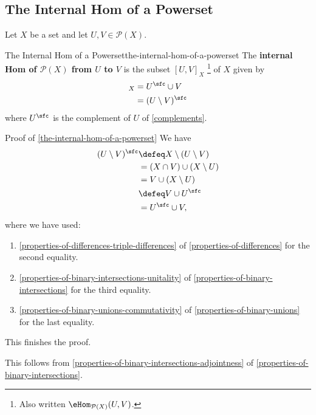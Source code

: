 \subsection{The Internal Hom of a Powerset}\label{subsection-the-internal-hom-of-a-powerset}
Let $X$ be a set and let $U,V\in\mathcal{P}(X)$.
\begin{proposition}{The Internal Hom of a Powerset}{the-internal-hom-of-a-powerset}%
    The \textbf{internal Hom of $\mathcal{P}(X)$ from $U$ to $V$} is the subset $[U,V]_{X}$%
    \footnote{%
        Also written $\eHom_{\mathcal{P}(X)}(U,V)$.
        \par\vspace*{\TCBBoxCorrection}
    } %
    of $X$ given by
    \begin{align*}
        [U,V]_{X} &= U^{\sfc}\cup V\\%
                  &= (U\setminus V)^{\sfc}%
    \end{align*}
    where $U^{\sfc}$ is the complement of $U$ of \cref{complements}.
\end{proposition}
\begin{Proof}{Proof of \cref{the-internal-hom-of-a-powerset}}%
    We have
    \begin{align*}
        (U\setminus V)^{\sfc} &\defeq X\setminus(U\setminus V)\\%
                              &=      (X\cap V)\cup(X\setminus U)\\%
                              &=      V\cup(X\setminus U)\\%
                              &\defeq V\cup U^{\sfc}\\%
                              &=      U^{\sfc}\cup V,%
    \end{align*}
    where we have used:
    \begin{enumerate}
        \item\label{proof-of-the-internal-hom-of-a-powerset-1}\cref{properties-of-differences-triple-differences} of \cref{properties-of-differences} for the second equality.
        \item\label{proof-of-the-internal-hom-of-a-powerset-2}\cref{properties-of-binary-intersections-unitality} of \cref{properties-of-binary-intersections} for the third equality.
        \item\label{proof-of-the-internal-hom-of-a-powerset-3}\cref{properties-of-binary-unions-commutativity} of \cref{properties-of-binary-unions} for the last equality.
    \end{enumerate}
    This finishes the proof.

    This follows from \cref{properties-of-binary-intersections-adjointness} of \cref{properties-of-binary-intersections}.
\end{Proof}

